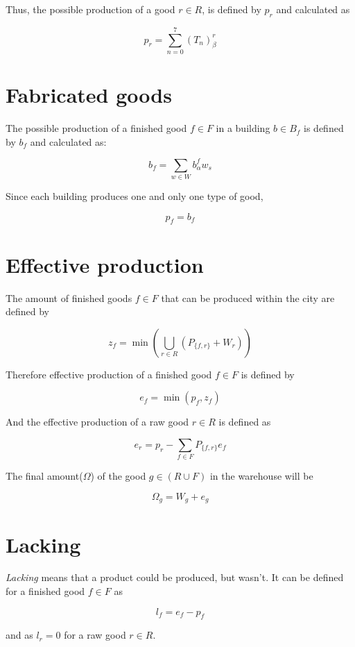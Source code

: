 \documentclass[a4paper,twocolumn]{article}
\begin{document}
Thus, the possible production of a good $r \in R$, is defined by $p_r$ and calculated as

\begin{equation}
p_r = \sum^7_{n=0} (T_n)^r_\beta
\end{equation}

\section{Fabricated goods}

The possible production of a finished good $f \in F$ in a building $b \in B_f$ is defined by $b_f$ and calculated as:

\begin{equation}
b_f = \sum_{w \in W} b_\alpha^f w_s
\end{equation}

Since each building produces one and only one type of good,

\begin{equation}
p_f = b_f
\end{equation}

\section{Effective production}

The amount of finished goods $f \in F$ that can be produced within the city are defined by

\begin{equation}
z_f = \min\left(\bigcup_{r\in R} (P_{\{f,r\}} + W_r )\right)
\end{equation}

Therefore effective production of a finished good $f\in F$ is defined by

\begin{equation}
e_f = \min(p_f, z_f)
\end{equation}

And the effective production of a raw good $r\in R$ is defined as

\begin{equation}
e_r = p_r - \sum_{f\in F} P_{\{f,r\}} e_f
\end{equation}

The final amount($\Omega$) of the good $g\in (R\cup F)$ in the warehouse will be

\begin{equation}
\Omega_g = W_g + e_g
\end{equation}

\section{Lacking}

{\em Lacking} means that a product could be produced, but wasn't. It can be defined for a finished good $f\in F$ as

\begin{equation}
l_f = e_f - p_f
\end{equation}

and as $l_r = 0$ for a raw good $r\in R$.
\end{document}
